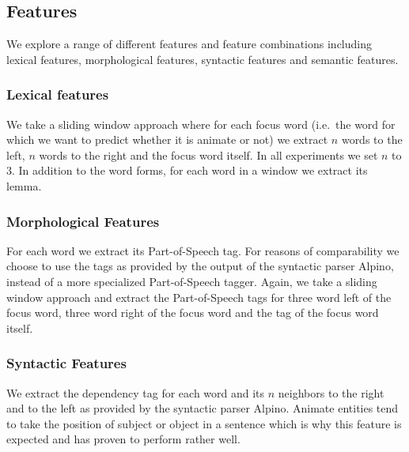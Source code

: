 \documentclass[a4paper,UKenglish]{oasics}
\begin{document}
\subsection{Features}

We explore a range of different features and feature combinations
including lexical features, morphological features, syntactic features
and semantic features.

\subsubsection{Lexical features}
We take a sliding window approach where for each focus word (i.e.\ the
word for which we want to predict whether it is animate or not) we
extract $n$ words to the left, $n$ words to the right and the focus
word itself. In all experiments we set $n$ to 3. In addition to the
word forms, for each word in a window we extract its lemma.

\subsubsection{Morphological Features}
For each word we extract its Part-of-Speech tag. For reasons of
comparability we choose to use the tags as provided by the output of
the syntactic parser Alpino, instead of a more specialized
Part-of-Speech tagger. Again, we take a sliding window approach and
extract the Part-of-Speech tags for three word left of the focus word,
three word right of the focus word and the tag of the focus word
itself.

\subsubsection{Syntactic Features}
We extract the dependency tag for each word and its $n$ neighbors to
the right and to the left as provided by the syntactic parser
Alpino. Animate entities tend to take the position of subject or
object in a sentence which is why this feature is expected and has
proven to perform rather well.
\end{document}
